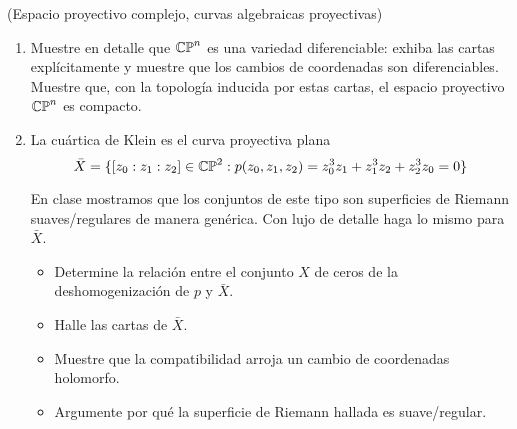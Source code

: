 \begin{exercise}
(Espacio proyectivo complejo, curvas algebraicas proyectivas)

\begin{enumerate}[label=\alph*)]
    \item Muestre en detalle que $\mathbb {CP}^n$ es una variedad diferenciable: exhiba las cartas explícitamente y muestre que los cambios de coordenadas son diferenciables. Muestre que, con la topología inducida por estas cartas, el espacio proyectivo $\mathbb {CP}^n$ es compacto.
    
    \item La cuártica de Klein es el curva proyectiva plana
    $$\bar X = \{ [z_0 : z_1 : z_2] \in \mathbb {CP}^2 : p(z_0, z_1, z_2) = z_0^3 z_1 + z_1^3 z_2 + z_2^3 z_0 = 0 \}$$
    
    En clase mostramos que los conjuntos de este tipo son superficies de Riemann suaves/regulares de manera genérica. Con lujo de detalle haga lo mismo para $\bar X$.
    \begin{itemize}
        \item Determine la relación entre el conjunto $X$ de ceros de la deshomogenización de $p$ y $\bar X$.
        \item Halle las cartas de $\bar X$.
        \item Muestre que la compatibilidad arroja un cambio de coordenadas holomorfo.
        \item Argumente por qué la superficie de Riemann hallada es suave/regular.
    \end{itemize}
\end{enumerate}
\end{exercise}

